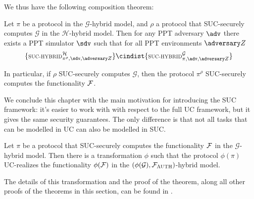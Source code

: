 We thus have the following composition theorem:
\begin{theorem}
    Let $\pi$ be a protocol in the $\mathcal G$-hybrid model, and $\rho$ a protocol that SUC-securely computes $\mathcal G$ in the $\mathcal H$-hybrid model. Then for any PPT adversary $\adv$ there exists a PPT simulator $\sdv$ such that for all PPT environments $\zdv$
    $$ \{ \textsc{\scriptsize SUC-HYBRID}^{\mathcal H}_{\pi^{\rho}, \sdv, \zdv} \} \cindist \{ \textsc{\scriptsize SUC-HYBRID}^{\mathcal G}_{\pi, \adv, \zdv} \}$$
    
    In particular, if $\rho$ SUC-securely computes $\mathcal G$, then the protocol $\pi^\rho$ SUC-securely computes the functionality $\mathcal{F}$.
\end{theorem}

We conclude this chapter with the main motivation for introducing the SUC framework: it's easier to work with with respect to the full UC framework, but it gives the same security guarantees. The only difference is that not all tasks that can be modelled in UC can also be modelled in SUC.

\begin{theorem}
    Let $\pi$ be a protocol that SUC-securely computes the functionality $\mathcal{F}$ in the $\mathcal G$-hybrid model. Then there is a transformation $\phi$ such that the protocol $\phi(\pi)$ UC-realizes the functionality $\phi(\mathcal{F})$ in the $(\phi(\mathcal G), \mathcal{F}_{\textsc{AUTH}})$-hybrid model.
\end{theorem}

The details of this transformation and the proof of the theorem, along all other proofs of the theorems in this section, can be found in \cite{Canetti_SUC}.